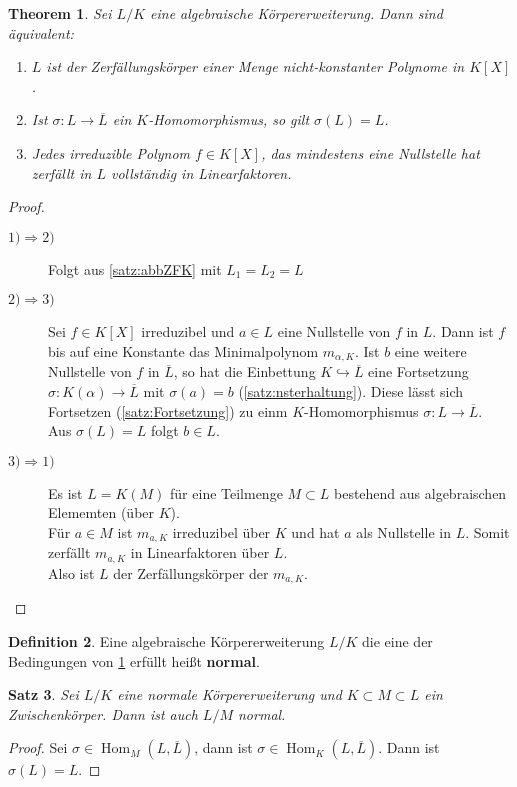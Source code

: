 \documentclass[10pt,a4paper]{article}
\newcommand{\al}{\ensuremath{\alpha}}
\newcommand{\ol}[1]{\overline{#1}}
\newcommand{\Hom}{\operatorname{Hom}}
\theoremstyle{plain}
\newtheorem{theorem}{Theorem}[section]
\newtheorem{satz}[theorem]{Satz}
\theoremstyle{definition}
\newtheorem{definition}[theorem]{Definition}
\theoremstyle{remark}
\begin{document}
	\begin{theorem}\label{thm:zfk}
		Sei $L/K$ eine algebraische Körpererweiterung. Dann sind äquivalent:\begin{enumerate}
			\item $L$ ist der Zerfällungskörper einer Menge nicht-konstanter Polynome in $K[X]$.
			\item Ist $\sigma:L\to\ol L$ ein $K$-Homomorphismus, so gilt $\sigma(L)=L$.
			\item Jedes irreduzible Polynom $f\in K[X]$, das mindestens eine Nullstelle hat zerfällt in $L$ vollständig in Linearfaktoren.
		\end{enumerate}
	\end{theorem}
	\begin{proof}
		\begin{description}
			\item[$1)\Rightarrow 2)$] Folgt aus \ref{satz:abbZFK} mit $L_1=L_2=L$
			\item[$2)\Rightarrow 3)$] Sei $f\in K[X]$ irreduzibel und $a\in L$ eine Nullstelle von $f$ in $L$. Dann ist $f$ bis auf eine Konstante das Minimalpolynom $m_{\al,K}$. Ist $b$ eine weitere Nullstelle von $f$ in $\ol L$, so hat die Einbettung $K\hookrightarrow\ol L$ eine Fortsetzung $\sigma:K(\al)\to\ol L$ mit $\sigma(a)=b$ (\ref{satz:nsterhaltung}). Diese lässt sich Fortsetzen (\ref{satz:Fortsetzung}) zu einm $K$-Homomorphismus $\sigma:L\to \ol L$.\\
			Aus $\sigma(L)=L$ folgt $b\in L$.
			\item[$3)\Rightarrow1)$] Es ist $L=K(M)$ für eine Teilmenge $M\subset L$ bestehend aus algebraischen Elememten (über $K$).\\
			Für $a\in M$ ist $m_{a,K}$ irreduzibel über $K$ und hat $a$ als Nullstelle in $L$. Somit zerfällt $m_{a,K}$ in Linearfaktoren über $L$.\\
			Also ist $L$ der Zerfällungskörper der $m_{a,K}$.
		\end{description}
	\end{proof}

	\begin{definition}
		Eine algebraische Körpererweiterung $L/K$ die eine der Bedingungen von \ref{thm:zfk} erfüllt heißt \textbf{normal}.
	\end{definition}

	\begin{satz}
		Sei $L/K$ eine normale Körpererweiterung und $K\subset M\subset L$ ein Zwischenkörper. Dann ist auch $L/M$ normal.
	\end{satz}
	\begin{proof}
		Sei $\sigma\in\Hom_M(L,\ol L)$, dann ist $\sigma\in \Hom_K(L,\ol L)$. Dann ist $\sigma(L)=L$.
	\end{proof}
\end{document}
